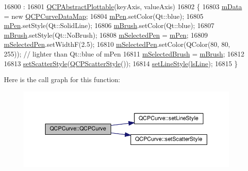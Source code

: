 \begin{DoxyCode}
16800                                                        :
16801   \hyperlink{class_q_c_p_abstract_plottable_af78a036e40db6f53a31abadc5323715a}{QCPAbstractPlottable}(keyAxis, valueAxis)
16802 \{
16803   \hyperlink{class_q_c_p_curve_a88d533e455bca96004b049e99168731b}{mData} = \textcolor{keyword}{new} \hyperlink{qcustomplot_8h_a444d37ec9cb2951b3a7fe443c34d1658}{QCPCurveDataMap};
16804   \hyperlink{class_q_c_p_abstract_plottable_a67bc0622fd1b9fa14e54c14922dcec66}{mPen}.setColor(Qt::blue);
16805   \hyperlink{class_q_c_p_abstract_plottable_a67bc0622fd1b9fa14e54c14922dcec66}{mPen}.setStyle(Qt::SolidLine);
16806   \hyperlink{class_q_c_p_abstract_plottable_a33f00674c0161c13315ab9da0895418e}{mBrush}.setColor(Qt::blue);
16807   \hyperlink{class_q_c_p_abstract_plottable_a33f00674c0161c13315ab9da0895418e}{mBrush}.setStyle(Qt::NoBrush);
16808   \hyperlink{class_q_c_p_abstract_plottable_a10619472f5d5e10e9519a599f1cf5576}{mSelectedPen} = \hyperlink{class_q_c_p_abstract_plottable_a67bc0622fd1b9fa14e54c14922dcec66}{mPen};
16809   \hyperlink{class_q_c_p_abstract_plottable_a10619472f5d5e10e9519a599f1cf5576}{mSelectedPen}.setWidthF(2.5);
16810   \hyperlink{class_q_c_p_abstract_plottable_a10619472f5d5e10e9519a599f1cf5576}{mSelectedPen}.setColor(QColor(80, 80, 255)); \textcolor{comment}{// lighter than Qt::blue of mPen}
16811   \hyperlink{class_q_c_p_abstract_plottable_aea3c0da30c7a8be23ad5f2d9bca36762}{mSelectedBrush} = \hyperlink{class_q_c_p_abstract_plottable_a33f00674c0161c13315ab9da0895418e}{mBrush};
16812   
16813   \hyperlink{class_q_c_p_curve_a55e43b44709bf50a35500644988aa706}{setScatterStyle}(\hyperlink{class_q_c_p_scatter_style}{QCPScatterStyle}());
16814   \hyperlink{class_q_c_p_curve_a4a377ec863ff81a1875c3094a6177c19}{setLineStyle}(\hyperlink{class_q_c_p_curve_a2710e9f79302152cff794c6e16cc01f1ade5822ce6fbf131d3df131795c2e1003}{lsLine});
16815 \}
\end{DoxyCode}


Here is the call graph for this function\+:\nopagebreak
\begin{figure}[H]
\begin{center}
\leavevmode
\includegraphics[width=350pt]{class_q_c_p_curve_a36de58e2652b3fa47bdf9187d421d3ce_cgraph}
\end{center}
\end{figure}



